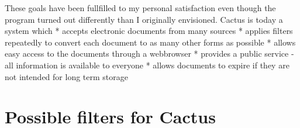    These goals have been fullfilled to my personal satisfaction even
   though the program turned out differently than I originally
   envisioned. Cactus is today a system which
     * accepts electronic documents from many sources
     * applies filters repeatedly to convert each document to as many
       other forms as possible
     * allows easy access to the documents through a webbrowser
     * provides a public service - all information is available to
       everyone
     * allows documents to expire if they are not intended for long term
       storage







\chapter{Possible filters for Cactus}










